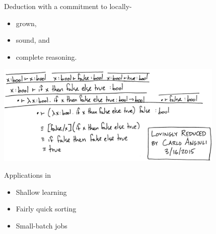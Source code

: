 \documentclass{beamer}
\begin{document}
\begin{frame}
\Large
Deduction with a commitment to locally-
\begin{itemize}
\Large
\item grown,
\item sound, and
\item complete reasoning.
\end{itemize}
\end{frame}

\begin{frame}
\centering
\includegraphics[width=4.3in]{../isfalse.png}
\end{frame}

\begin{frame}
\Large
Applications in
\begin{itemize}
\Large
\item Shallow learning
\item Fairly quick sorting
\item Small-batch jobs
\end{itemize}
\end{frame}
\end{document}
